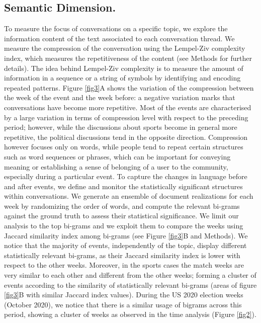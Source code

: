 \documentclass[fleqn,10pt]{wlscirep}
\begin{document}
\subsection*{Semantic Dimension.}
To measure the focus of conversations on a specific topic, we explore the information content of the text associated to each conversation thread.
We measure the compression of the conversation using the Lempel-Ziv complexity index, which measures the repetitiveness of the content (see Methods for further details). 
The idea behind Lempel-Ziv complexity is to measure the amount of information in a sequence or a string of symbols by identifying and encoding repeated patterns. 
Figure \ref{fig3}A shows the variation of the compression between the week of the event and the week before: a negative variation marks that conversations have become more repetitive. 
Most of the events are characterised by a large variation in terms of compression level with respect to the preceding period; however, while the discussions about sports become in general more repetitive, the political discussions tend in the opposite direction.
Compression however focuses only on words, while people tend to repeat certain structures such as word sequences or phrases, which can be important for conveying meaning or establishing a sense of belonging of a user to the community, especially during a particular event.
To capture the changes in language before and after events, we define and monitor the statistically significant structures within conversations. We generate an ensemble of document realizations for each week by randomizing the order of words, and compute the relevant bi-grams against the ground truth to assess their statistical significance.
We limit our analysis to the top bi-grams and we exploit them to compare the weeks using Jaccard similarity index among bi-grams (see Figure \ref{fig3}B and Methods). We notice that the majority of events, independently of the topic, display different statistically relevant bi-grams, as their Jaccard similarity index is lower with respect to the other weeks.
Moreover, in the sports cases the match weeks are very similar to each other and different from the other weeks; forming a cluster of events according to the similarity of statistically relevant bi-grams (areas of figure \ref{fig3}B with similar Jaccard index values). 
During the US 2020 election weeks (October 2020), we notice that there is a similar usage of bigrams across this period, showing a cluster of weeks as observed in the time analysis (Figure \ref{fig2}). 
%
\end{document}
